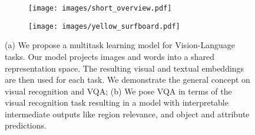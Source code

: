 \begin{figure}[t]

\centering
\begin{subfigure}[b]{\linewidth}
\texttt{[image: images/short\_overview.pdf]}
\caption{}
\label{fig:short_overview}
\end{subfigure}

\centering
\begin{subfigure}[b]{\linewidth}
\texttt{[image: images/yellow\_surfboard.pdf]}
\caption{}
\label{fig:teaser_interpert}
\end{subfigure}

\caption{(a) We propose a multitask learning model for Vision-Language tasks. Our model projects images and words into a shared representation space. The resulting visual and textual embeddings are then used for each task. We demonstrate the general concept on visual recognition and VQA; (b) We pose VQA in terms of the visual recognition task resulting in a model with interpretable intermediate outputs like region relevance, and object and attribute predictions.}
\end{figure}